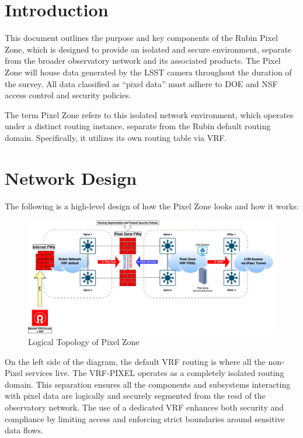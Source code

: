 \section{Introduction}
This document outlines the purpose and key components of the Rubin Pixel Zone, which is designed to provide an isolated and secure environment, separate from the broader observatory network and its associated products. The Pixel Zone will house data generated by the LSST camera throughout the duration of the survey. All data classified as “pixel data” must adhere to DOE and NSF access control and security policies.

The term Pixel Zone refers to this isolated network environment, which operates under a distinct routing instance, separate from the Rubin default routing domain. Specifically, it utilizes its own routing table via VRF. 

\section{Network Design}

The following is a high-level design of how the Pixel Zone looks and how it works:

\begin{figure}
    \includegraphics[width=13cm]{pixel_zone.jpg}
    \centering
    \caption*{Logical Topology of Pixel Zone}
\end{figure}

On the left side of the diagram, the default VRF routing is where all the non-Pixel services live. The VRF-PIXEL operates as a completely isolated routing domain. This separation ensures all the components and subsystems interacting with pixel data are logically and securely segmented from the resd of the observatory network. The use of a dedicated VRF enhances both security and compliance by limiting access and enforcing strict boundaries around sensitive data flows.

